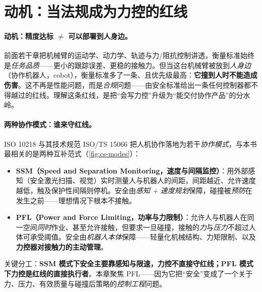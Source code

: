 \section{动机：当法规成为力控的红线}
\label{sec:cs-motivation}

\paragraph{动机：精度达标 $\neq$ 可以部署到人身边。}
前面若干章把机械臂的运动学、动力学、轨迹与力/阻抗控制讲透，衡量标准始终是\emph{任务品质}——更小的跟踪误差、更稳的接触力。但当这台机械臂被放到\emph{人身边}（协作机器人，cobot），衡量标准多了一条、且优先级最高：\textbf{它撞到人时不能造成伤害}。这不再是性能问题，而是\emph{合规}问题——由安全标准给出一条任何控制器都不得越过的红线。理解这条红线，是把“会写力控”升级为“能交付协作产品”的分水岭。

\paragraph{两种协作模式：谁来守红线。}
ISO 10218 与其技术规范 ISO/TS 15066 把人机协作落地为若干\emph{协作模式}，与本书最相关的是两种互补范式（\cref{fig:cs-modes}）：
\begin{itemize}
  \item \textbf{SSM（Speed and Separation Monitoring，速度与间隔监控）}：用外部感知（安全激光扫描、视觉）实时测量人与机器人的间距，间距越近、允许速度越低，触及保护性间隔则停机。安全由\emph{感知 + 速度规划}保障，碰撞被\emph{预防}在发生之前——理想情况下根本不接触。
  \item \textbf{PFL（Power and Force Limiting，功率与力限制）}：允许人与机器人在同一空间\emph{同时}作业、甚至允许接触，但要求一旦碰撞，接触的\emph{力}与\emph{压力}不超过人体可承受阈值。安全由\emph{机器人本体}保障——轻量化机械结构、力矩限制、以及\textbf{力控器对接触力的主动管理}。
\end{itemize}
关键分工：\textbf{SSM 模式下安全主要靠感知与限速，力控不直接守红线；PFL 模式下力控是红线的直接执行者}。本章聚焦 PFL——因为它把“安全”变成了一个关于力、压力、有效质量与碰撞后策略的\emph{控制工程}问题。

